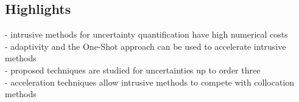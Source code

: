 \documentclass[10pt,a4paper]{article}      %
\begin{document}
\subsection*{Highlights}
- intrusive methods for uncertainty quantification have high numerical costs\\
- adaptivity and the One-Shot approach can be used to accelerate intrusive methods\\
- proposed techniques are studied for uncertainties up to order three\\
- acceleration techniques allow intrusive methods to compete with collocation methods
\end{document}
